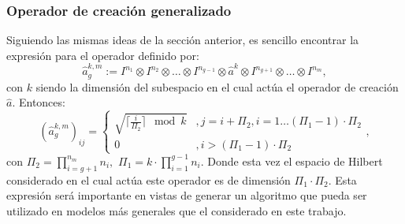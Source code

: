 \subsubsection{Operador de creaci\'on generalizado}\label{sec:operador_creacion_generalizado}
\quad Siguiendo las mismas ideas de la secci\'on anterior, es sencillo encontrar la expresi\'on para el operador definido por:\begin{equation}
 \hat{a}^{k,m}_g:=I^{n_1}\otimes I^{n_2} \otimes \ldots \otimes I^{n_{g-1}} \otimes \hat{a}^k \otimes I^{n_{g+1}}\otimes \ldots \otimes I^{n_m},
\end{equation}
con $k$ siendo la dimensi\'on del subespacio en el cual act\'ua el operador de creaci\'on $\hat{a}$. Entonces:\begin{equation}
\left(\hat{a}^{k,m}_g\right)_{ij}=\left\{
\begin{array}{cl}
\sqrt{\lceil \frac{i}{\Pi_2} \rceil \mod k} & ,j=i+\Pi_2,i=1 \ldots (\Pi_1 -1)\cdot \Pi_2\\
0 & , i>(\Pi_1 -1)\cdot \Pi_2
\end{array}
\right.,
\end{equation}
con $\Pi_2=\prod^{n_m}_{i=g+1}n_i,\,\,\Pi_1=k\cdot\prod^{g-1}_{i=1}n_i$. Donde esta vez el espacio de Hilbert considerado en el cual act\'ua este operador es de dimensi\'on $\Pi_1 \cdot \Pi_2$. Esta expresi\'on ser\'a importante en vistas de generar un algoritmo que pueda ser utilizado en modelos m\'as generales que el considerado en este trabajo.
